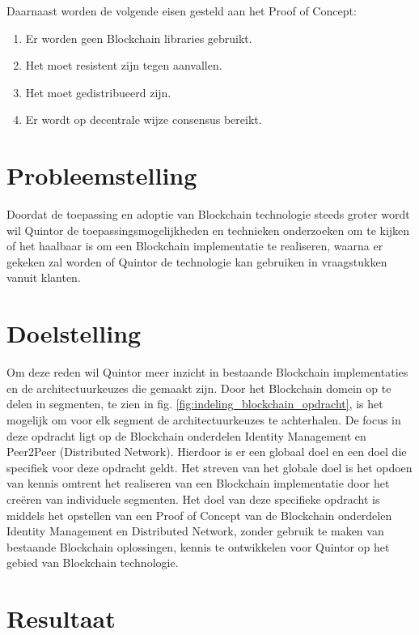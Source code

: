 Daarnaast worden de volgende eisen gesteld aan het Proof of Concept:
\begin{enumerate}[noitemsep]
  \item Er worden geen Blockchain libraries gebruikt.
  \item Het moet resistent zijn tegen aanvallen.
  \item Het moet gedistribueerd zijn.
  \item Er wordt op decentrale wijze consensus bereikt.
\end{enumerate}

\section{Probleemstelling}

Doordat de toepassing en adoptie van Blockchain technologie steeds groter wordt wil Quintor de toepassingsmogelijkheden en technieken onderzoeken om te kijken of het haalbaar is om een Blockchain implementatie te realiseren, waarna er gekeken zal worden of Quintor de technologie kan gebruiken in vraagstukken vanuit klanten.

\section{Doelstelling}

Om deze reden wil Quintor meer inzicht in bestaande Blockchain implementaties en de architectuurkeuzes die gemaakt zijn. Door het Blockchain domein op te delen in segmenten, te zien in fig. \ref{fig:indeling_blockchain_opdracht}, is het mogelijk om voor elk segment de architectuurkeuzes te achterhalen. De focus in deze opdracht ligt op de Blockchain onderdelen Identity Management en Peer2Peer (Distributed Network). Hierdoor is er een globaal doel en een doel die specifiek voor deze opdracht geldt. Het streven van het globale doel is het opdoen van kennis omtrent het realiseren van een Blockchain implementatie door het creëren van individuele segmenten. Het doel van deze specifieke opdracht is middels het opstellen van een Proof of Concept van de Blockchain onderdelen Identity Management en Distributed Network, zonder gebruik te maken van bestaande Blockchain oplossingen, kennis te ontwikkelen voor Quintor op het gebied van Blockchain technologie.

\section{Resultaat}

